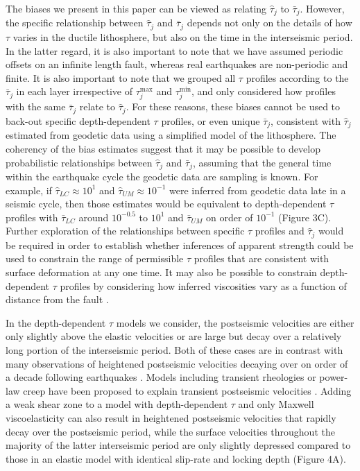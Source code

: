 The biases we present in this paper can be viewed as relating
$\hat{\tau}_j$ to $\bar{\tau}_j$.  However, the specific relationship
between $\hat{\tau}_j$ and $\bar{\tau}_j$ depends not only on the
details of how $\tau$ varies in the ductile lithosphere, but also on
the time in the interseismic period. In the latter regard, it is also
important to note that we have assumed periodic offsets on an infinite
length fault, whereas real earthquakes are non-periodic and finite.
It is also important to note that we grouped all $\tau$ profiles
according to the $\bar{\tau}_j$ in each layer irrespective of
$\tau^{\max}_j$ and $\tau^{\min}_j$, and only considered how profiles
with the same $\bar{\tau}_j$ relate to $\hat{\tau}_j$.  For these
reasons, these biases cannot be used to back-out specific
depth-dependent $\tau$ profiles, or even unique $\bar{\tau}_j$,
consistent with $\hat{\tau}_j$ estimated from geodetic data using a
simplified model of the lithosphere.  The coherency of the bias
estimates suggest that it may be possible to develop probabilistic
relationships between $\hat{\tau}_j$ and $\bar{\tau}_j$, assuming that
the general time within the earthquake cycle the geodetic data are
sampling is known.  For example, if $\hat{\tau}_{LC} \approx 10^{1}$
and $\hat{\tau}_{UM} \approx 10^{-1}$ were inferred from geodetic data
late in a seismic cycle, then those estimates would be equivalent to
depth-dependent $\tau$ profiles with $\bar{\tau}_{LC}$ around
$10^{-0.5}$ to $10^{1}$ and $\bar{\tau}_{UM}$ on order of $10^{-1}$
(Figure 3C). Further exploration of the relationships between specific
$\tau$ profiles and $\hat{\tau}_j$ would be required in order to
establish whether inferences of apparent strength could be used to
constrain the range of permissible $\tau$ profiles that are consistent
with surface deformation at any one time.  It may also be possible to
constrain depth-dependent $\tau$ profiles by considering how inferred
viscosities vary as a function of distance from the fault
\citep{Yamasaki2012}.

In the depth-dependent $\tau$ models we consider, the postseismic
velocities are either only slightly above the elastic velocities or
are large but decay over a relatively long portion of the interseismic
period. Both of these cases are in contrast with many observations of
heightened postseismic velocities decaying over on order of a decade
following earthquakes \citep[e.g.,][]{Ergintav2009}. Models including
transient rheologies or power-law creep have been proposed to explain
transient postseismic velocities \citep[e.g.,][]{Pollitz2003,
Freed2006b, Ryder2007}.  Adding a weak shear zone to a model with
depth-dependent $\tau$ and only Maxwell viscoelasticity can also
result in heightened postseismic velocities that rapidly decay over
the postseismic period, while the surface velocities throughout the
majority of the latter interseismic period are only slightly depressed
compared to those in an elastic model with identical slip-rate and
locking depth (Figure 4A).


